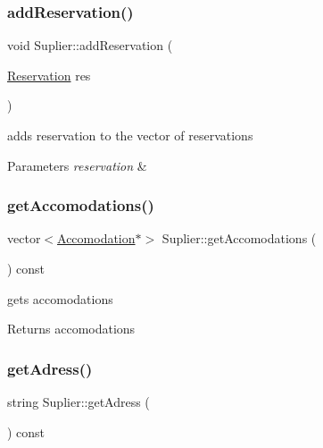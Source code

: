 \subsubsection{\texorpdfstring{add\+Reservation()}{addReservation()}}
{\footnotesize\ttfamily void Suplier\+::add\+Reservation (\begin{DoxyParamCaption}\item[{\hyperlink{class_reservation}{Reservation}}]{res }\end{DoxyParamCaption})}



adds reservation to the vector of reservations 


\begin{DoxyParams}{Parameters}
{\em reservation} & \\
\hline
\end{DoxyParams}
\hypertarget{class_suplier_a87e65aee86b034f1b4a112abb83ff53a}{}\label{class_suplier_a87e65aee86b034f1b4a112abb83ff53a} 
\subsubsection{\texorpdfstring{get\+Accomodations()}{getAccomodations()}}
{\footnotesize\ttfamily vector$<$\hyperlink{class_accomodation}{Accomodation}$\ast$$>$ Suplier\+::get\+Accomodations (\begin{DoxyParamCaption}{ }\end{DoxyParamCaption}) const\hspace{0.3cm}{\ttfamily [inline]}}



gets accomodations 

\begin{DoxyReturn}{Returns}
accomodations 
\end{DoxyReturn}
\hypertarget{class_suplier_ad6e654f4f26f6268b50f51df117793fb}{}\label{class_suplier_ad6e654f4f26f6268b50f51df117793fb} 
\subsubsection{\texorpdfstring{get\+Adress()}{getAdress()}}
{\footnotesize\ttfamily string Suplier\+::get\+Adress (\begin{DoxyParamCaption}{ }\end{DoxyParamCaption}) const\hspace{0.3cm}{\ttfamily [inline]}}



